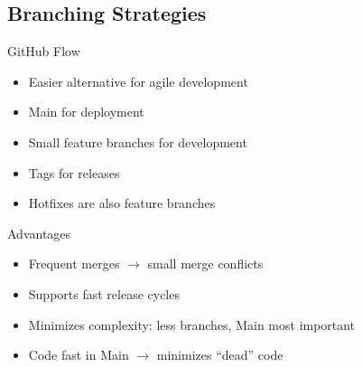 \subsection{Branching Strategies}
\begin{frame}{\insertsubsection {}}
	\begin{fancycolumns}[animation=none]
		\begin{definition}{GitHub Flow}
			\begin{itemize}
				\item Easier alternative for agile development
				\item Main for deployment
				\item Small feature branches for development
				\item Tags for releases
				\item Hotfixes are also feature branches
			\end{itemize}
		\end{definition}\pause
		\begin{note}{Advantages}
			\begin{itemize}
				\item Frequent merges $\rightarrow$ small merge conflicts
				\item Supports fast release cycles
				\item Minimizes complexity: less branches, Main most important
				\item Code fast in Main $\rightarrow$ minimizes \enquote{dead} code
			\end{itemize}
		\end{note}
		\nextcolumn
	\end{fancycolumns}
\end{frame}
	


       	